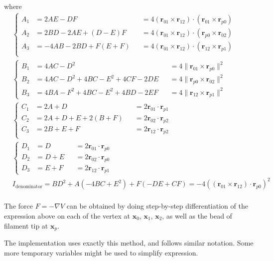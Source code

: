\documentclass[main.tex]{subfiles}
\begin{document}
where
\begin{equation}
\begin{aligned}
&\left\{
\begin{aligned}
A_1 &= 2AE-DF &&= 4 (\bm{r}_{01}\times\bm{r}_{12}) \cdot (\bm{r}_{01}\times\bm{r}_{p0})\\
A_2 &= 2BD-2AE+(D-E)F &&= 4 (\bm{r}_{01}\times\bm{r}_{12}) \cdot (\bm{r}_{p0}\times\bm{r}_{02})\\
A_3 &= -4AB-2BD+F(E+F) &&= 4 (\bm{r}_{01}\times\bm{r}_{12}) \cdot (\bm{r}_{12}\times\bm{r}_{p1})\\
\end{aligned}
\right.\\
&\left\{
\begin{aligned}
B_1 &= 4AC-D^2 &&= 4 \|\bm{r}_{01}\times\bm{r}_{p0}\|^2\\
B_2 &= 4AC-D^2+4BC-E^2+4CF-2DE &&= 4 \|\bm{r}_{p0}\times\bm{r}_{02}\|^2\\
B_3 &= 4BA-F^2+4BC-E^2+4BD-2EF &&= 4 \|\bm{r}_{12}\times\bm{r}_{p1}\|^2
\end{aligned}
\right.\\
&\left\{
\begin{aligned}
C_1 &= 2A+D &&= 2\bm{r}_{01}\cdot\bm{r}_{p1}\\
C_2 &= 2A+D+E+2(B+F) &&= 2\bm{r}_{02}\cdot\bm{r}_{p2}\\
C_3 &= 2B+E+F &&= 2\bm{r}_{12}\cdot\bm{r}_{p2}\\
\end{aligned}
\right.\\
&\left\{
\begin{aligned}
D_1 &= D &&= 2\bm{r}_{01}\cdot\bm{r}_{p0}\\
D_2 &= D+E &&= 2\bm{r}_{02}\cdot\bm{r}_{p0}\\
D_3 &= E+F &&= 2\bm{r}_{12}\cdot\bm{r}_{p1}
\end{aligned}
\right.\\
&I_\text{denominator} = BD^2 + A(-4BC+E^2) + F(-DE+CF) = -4 \left( (\bm{r}_{01}\times\bm{r}_{12}) \cdot \bm{r}_{p0} \right)^2\\
\end{aligned}
\end{equation}

The force \( F = -\nabla V \) can be obtained by doing step-by-step differentiation of the expression above on each of the vertex at \(\bm{x}_0\), \(\bm{x}_1\), \(\bm{x}_2\), as well as the bead of filament tip at \(\bm{x}_p\).

The implementation uses exactly this method, and follows similar notation. Some more temporary variables might be used to simplify expression.
\end{document}
